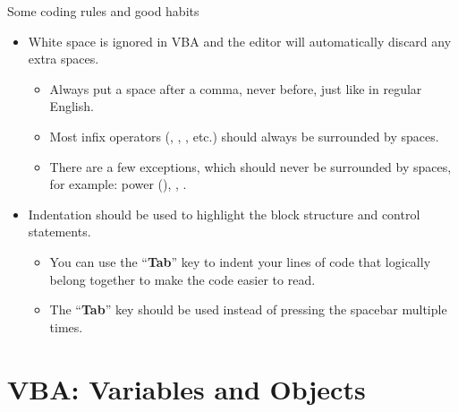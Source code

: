 \documentclass{beamer}
\begin{document}
\begin{frame}{Some coding rules and good habits}
\begin{itemize}
  \item White space is ignored in VBA and the editor will automatically discard any extra spaces.
  \begin{itemize}
    \item Always put a space after a comma, never before, just like in regular English.
    \item Most infix operators (\code{=}, \code{+}, \code{-}, etc.) should always be surrounded by spaces.
    \item There are a few exceptions, which should never be surrounded by spaces,
          for example: power (\code{\^{}}), \code{\$}, .
  \end{itemize}
  \vspace{0.4em}
  \item Indentation should be used to highlight the block structure and control statements.
  \begin{itemize}
    \item You can use the ``\textbf{Tab}'' key to indent your lines of code that logically
          belong together to make the code easier to read.
    \item The ``\textbf{Tab}'' key should be used instead of pressing the spacebar multiple times.
  \end{itemize}
\end{itemize}
\end{frame}

\section{VBA: Variables and Objects}

\sectionframe
\end{document}
